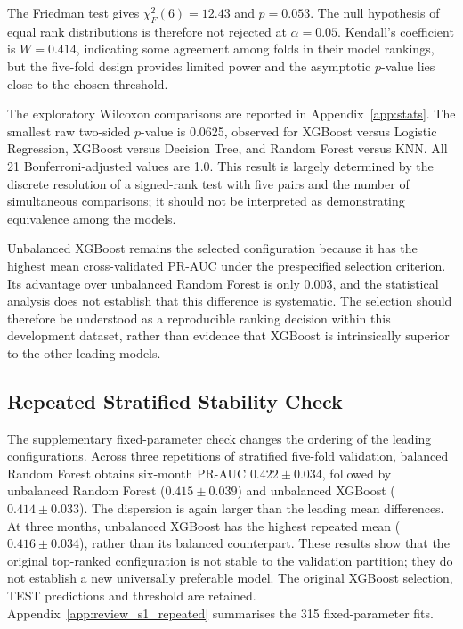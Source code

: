 The Friedman test gives $\chi^2_F(6)=12.43$ and $p=0.053$. The null hypothesis of equal rank distributions is therefore not rejected at $\alpha=0.05$. Kendall's coefficient is $W=0.414$, indicating some agreement among folds in their model rankings, but the five-fold design provides limited power and the asymptotic $p$-value lies close to the chosen threshold.

The exploratory Wilcoxon comparisons are reported in Appendix~\ref{app:stats}. The smallest raw two-sided $p$-value is 0.0625, observed for XGBoost versus Logistic Regression, XGBoost versus Decision Tree, and Random Forest versus KNN. All 21 Bonferroni-adjusted values are 1.0. This result is largely determined by the discrete resolution of a signed-rank test with five pairs and the number of simultaneous comparisons; it should not be interpreted as demonstrating equivalence among the models.

Unbalanced XGBoost remains the selected configuration because it has the highest mean cross-validated PR-AUC under the prespecified selection criterion. Its advantage over unbalanced Random Forest is only 0.003, and the statistical analysis does not establish that this difference is systematic. The selection should therefore be understood as a reproducible ranking decision within this development dataset, rather than evidence that XGBoost is intrinsically superior to the other leading models.

\subsection{Repeated Stratified Stability Check}
\label{subsec:results_repeated_stability}

The supplementary fixed-parameter check changes the ordering of the leading configurations. Across three repetitions of stratified five-fold validation, balanced Random Forest obtains six-month PR-AUC $0.422\pm0.034$, followed by unbalanced Random Forest ($0.415\pm0.039$) and unbalanced XGBoost ($0.414\pm0.033$). The dispersion is again larger than the leading mean differences. At three months, unbalanced XGBoost has the highest repeated mean ($0.416\pm0.034$), rather than its balanced counterpart. These results show that the original top-ranked configuration is not stable to the validation partition; they do not establish a new universally preferable model. The original XGBoost selection, TEST predictions and threshold are retained. Appendix~\ref{app:review_s1_repeated} summarises the 315 fixed-parameter fits.



